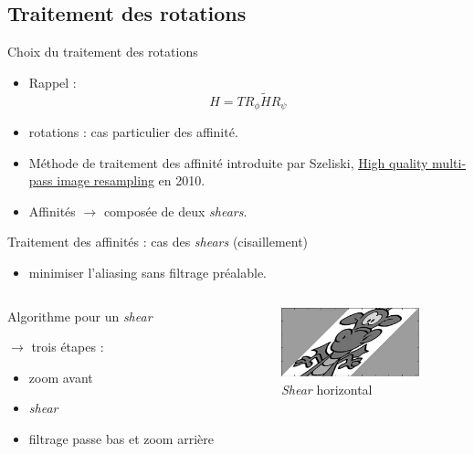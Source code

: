 \documentclass[c,12pt]{beamer}
\newcommand{\ra}[0]{\rightarrow}
\begin{document}
\subsection{Traitement des rotations}
\begin{frame}{Choix du traitement des rotations}



\begin{itemize}
\item Rappel : \[H = T R_\phi \tilde H R_\psi\]
\item rotations : cas particulier des affinité. 
\item Méthode de traitement des affinité introduite par Szeliski, \underline{High quality multi-pass image resampling} en 2010.
\item Affinités $\ra$ composée de deux \emph{shears}.

\end{itemize}

\begin{frame}{Traitement des affinités : cas des \emph{shears} (cisaillement)}



\begin{itemize}
\item minimiser l'aliasing sans filtrage préalable.
\end{itemize}

\begin{columns}
\begin{column}{5cm}

\begin{block}{Algorithme pour un \emph{shear}}

$\ra$ trois étapes :

\begin{itemize}
\item zoom avant
\item \emph{shear}
\item filtrage passe bas et zoom arrière
\end{itemize}

\end{block}
  
 \end{column}

\begin{column}{5cm}

\begin{figure}
\centering
\includegraphics[width=4cm]{dragonshear.jpg}
\caption{\emph{Shear} horizontal}
\end{figure}


\end{column}
\end{columns}
\end{frame}
\end{frame}
\end{document}
